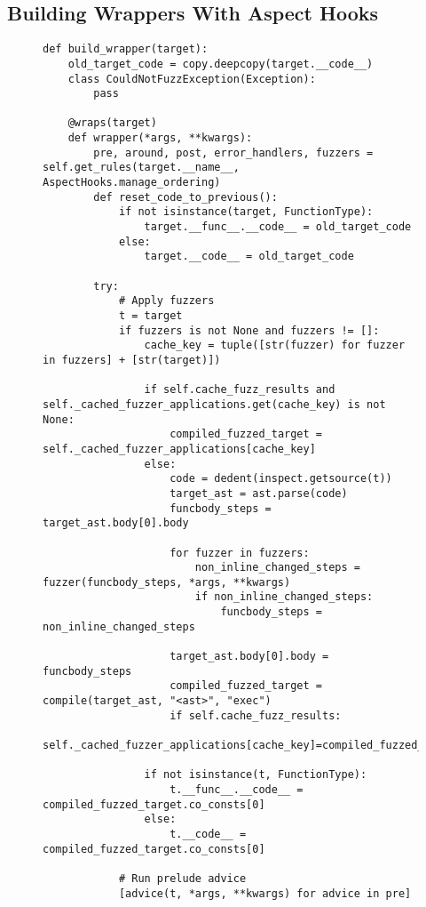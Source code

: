 \subsection{Building Wrappers With Aspect Hooks}

\begin{figure}
    \centering
    \begin{lstlisting}[style=footnotesize_python]
def build_wrapper(target):
    old_target_code = copy.deepcopy(target.__code__)
    class CouldNotFuzzException(Exception):
        pass

    @wraps(target)
    def wrapper(*args, **kwargs):
        pre, around, post, error_handlers, fuzzers = self.get_rules(target.__name__, AspectHooks.manage_ordering)
        def reset_code_to_previous():
            if not isinstance(target, FunctionType):
                target.__func__.__code__ = old_target_code
            else:
                target.__code__ = old_target_code

        try:
            # Apply fuzzers
            t = target
            if fuzzers is not None and fuzzers != []:
                cache_key = tuple([str(fuzzer) for fuzzer in fuzzers] + [str(target)])

                if self.cache_fuzz_results and self._cached_fuzzer_applications.get(cache_key) is not None:
                    compiled_fuzzed_target = self._cached_fuzzer_applications[cache_key]
                else:
                    code = dedent(inspect.getsource(t))
                    target_ast = ast.parse(code)
                    funcbody_steps = target_ast.body[0].body

                    for fuzzer in fuzzers:
                        non_inline_changed_steps = fuzzer(funcbody_steps, *args, **kwargs)
                        if non_inline_changed_steps:
                            funcbody_steps = non_inline_changed_steps

                    target_ast.body[0].body = funcbody_steps
                    compiled_fuzzed_target = compile(target_ast, "<ast>", "exec")
                    if self.cache_fuzz_results:
                        self._cached_fuzzer_applications[cache_key]=compiled_fuzzed_target

                if not isinstance(t, FunctionType):
                    t.__func__.__code__ =  compiled_fuzzed_target.co_consts[0]
                else:
                    t.__code__ = compiled_fuzzed_target.co_consts[0]

            # Run prelude advice
            [advice(t, *args, **kwargs) for advice in pre]


\end{lstlisting}
\end{figure}
